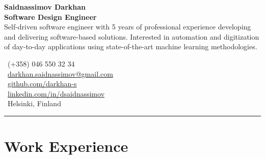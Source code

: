 \documentclass[a4paper,10pt]{article}
\begin{document}

\noindent
\begin{minipage}[t]{0.65\textwidth} %
    {\color{darkblue}\textbf{\LARGE Saidnassimov Darkhan}} \\[0.2cm]
    \textbf{\large Software Design Engineer} \\[0.2cm]
    Self-driven software engineer with 5 years of professional experience developing and delivering software-based solutions. Interested in automation and digitization of day-to-day applications using state-of-the-art machine learning methodologies.
\end{minipage}
\hfill
\begin{minipage}[t]{0.32\textwidth} %
    \vspace{0.5cm} %
    \raggedleft 
    \footnotesize %
    \faPhone\ (+358) 046 550 32 34 \\[0.2cm]
    \faEnvelope\ \href{mailto:darkhan.saidnassimov@gmail.com}{\mbox{darkhan.saidnassimov@gmail.com}} \\[0.2cm]
    \faGithub\ \href{https://github.com/darkhan-s}{\mbox{github.com/darkhan-s}} \\[0.2cm]
    \faLinkedin\ \href{https://www.linkedin.com/in/dsaidnassimov/}{\mbox{linkedin.com/in/dsaidnassimov}} \\[0.2cm]
    \faMapMarker\ Helsinki, Finland
\end{minipage}




\vspace{0.2cm}
\hrule
\vspace{0.1cm}

\section*{Work Experience}
\end{document}
